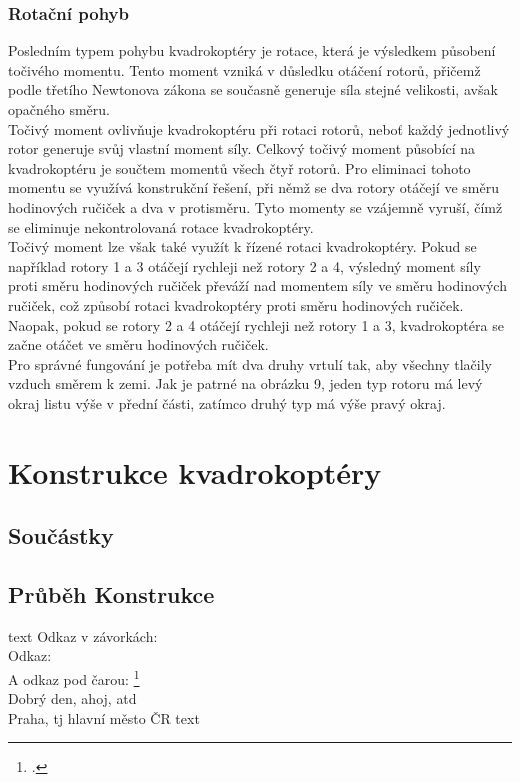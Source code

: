 \documentclass[12pt]{report}
\begin{document}
\section{Rotační pohyb}
Posledním typem pohybu kvadrokoptéry je rotace, která je výsledkem působení točivého momentu. Tento moment vzniká v důsledku otáčení rotorů, přičemž podle třetího Newtonova zákona se současně generuje síla stejné velikosti, avšak opačného směru.\\
Točivý moment ovlivňuje kvadrokoptéru při rotaci rotorů, neboť každý jednotlivý rotor generuje svůj vlastní moment síly. Celkový točivý moment působící na kvadrokoptéru je součtem momentů všech čtyř rotorů. Pro eliminaci tohoto momentu se využívá konstrukční řešení, při němž se dva rotory otáčejí ve směru hodinových ručiček a dva v protisměru. Tyto momenty se vzájemně vyruší, čímž se eliminuje nekontrolovaná rotace kvadrokoptéry.\\
Točivý moment lze však také využít k řízené rotaci kvadrokoptéry. Pokud se například rotory 1 a 3 otáčejí rychleji než rotory 2 a 4, výsledný moment síly proti směru hodinových ručiček převáží nad momentem síly ve směru hodinových ručiček, což způsobí rotaci kvadrokoptéry proti směru hodinových ručiček. Naopak, pokud se rotory 2 a 4 otáčejí rychleji než rotory 1 a 3, kvadrokoptéra se začne otáčet ve směru hodinových ručiček.\\
Pro správné fungování je potřeba mít dva druhy vrtulí tak, aby všechny tlačily vzduch směrem k zemi. Jak je patrné na obrázku 9, jeden typ rotoru má levý okraj listu výše v přední části, zatímco druhý typ má výše pravý okraj.
\part{Konstrukce kvadrokoptéry} %

\chapter{Součástky}
\lipsum[1]	

\chapter{Průběh Konstrukce}
text
Odkaz v závorkách: \parencite[see][page 900]{einstein}\\
Odkaz: \cite{knuthwebsite}\\
A odkaz pod čarou: \footcite[see][s. 42]{latexcompanion}\\
Dobrý den, ahoj, \gls{atd}\\
Praha, \gls{tj} hlavní město ČR
text
\end{document}
